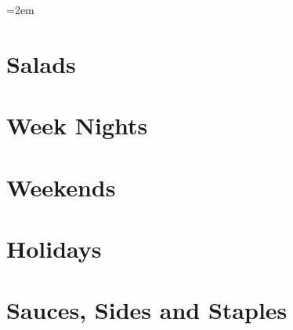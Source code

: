 \documentclass[landscape,12pt,openany]{book}
\begin{document}
\rmfamily

\setlength{\columnseprule}{0pt}
\columnsep=2em

\setcounter{tocdepth}{1}
\small
\tableofcontents

\normalsize

\setlength{\parskip}{.5em}

\chapter{Salads}











\chapter{Week Nights}















\chapter{Weekends}












\chapter{Holidays}




\chapter{Sauces, Sides and Staples}






\end{document}
